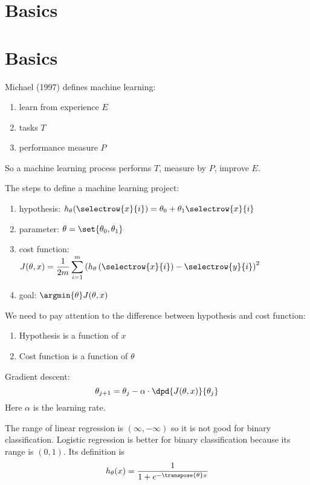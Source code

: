 \section{Basics}



\section{Basics}

Michael (1997) defines machine learning:
\begin{enumerate}
    \item learn from experience $E$
    \item tasks $T$
    \item performance measure $P$
\end{enumerate}

So a machine learning process performs $T$, measure by $P$, improve $E$.


The steps to define a machine learning project:
\begin{enumerate}
    \item hypothesis: $h_\theta ( \selectrow{x}{i} ) = \theta_0 + \theta_1 \selectrow{x}{i}$
    \item parameter: $\theta = \set{\theta_0, \theta_1}$
    \item cost function: $\displaystyle J(\theta, x) = \frac{1}{2m} \sum_{i=1}^m \left( h_\theta  \left(\selectrow{x}{i}\right) - \selectrow{y}{i} \right)^2$
    \item goal: $\displaystyle \argmin{\theta}  J(\theta,x)$
\end{enumerate}

We need to pay attention to the difference between hypothesis and cost function:
\begin{enumerate}
    \item Hypothesis is a function of $x$
    \item Cost function is a function of $\theta$
\end{enumerate}

Gradient descent:
\begin{equation}
    \theta_{j+1} = \theta_j - \alpha  \cdot \dpd{J(\theta, x)}{\theta_j}
\end{equation}
Here $\alpha$ is the learning rate.


The range of linear regression is $(\infty, -\infty)$ so it is not good for binary classification. Logistic regression is better for binary classification because its range is $(0, 1)$. Its definition is 
\begin{equation}
    h_\theta(x) = \frac{1}{1 + e^{- \transpose{\theta} x}}
\end{equation}

